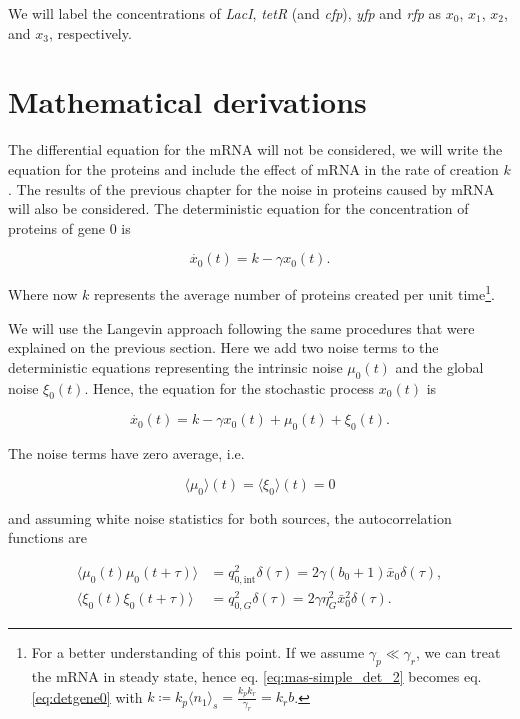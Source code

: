 We will label the concentrations of \textit{LacI}, \textit{tetR} (and \textit{cfp}), \textit{yfp} and \textit{rfp} as $x_0$, $x_1$, $x_2$, and $x_3$, respectively.

\section{Mathematical derivations}

The differential equation for the mRNA will not be considered, we will write the equation for the proteins and include the effect of mRNA in the rate of creation $k$. The results of the previous chapter for the noise in proteins caused by mRNA will also be considered. The deterministic equation for the concentration of proteins of gene $0$ is 

\begin{equation}
\label{eq:detgene0}
\dot{x_0}(t) = k - \gamma x_0(t).
\end{equation}

Where now $k$ represents the average number of proteins created per unit time\footnote{For a better understanding of this point. If we assume $\gamma_p\ll\gamma_r$, we can treat the mRNA in steady state, hence eq. \eqref{eq:mas-simple_det_2} becomes eq. \eqref{eq:detgene0} with $k \coloneqq k_p\langle n_1\rangle_s =  \frac{k_pk_r}{\gamma_r} = k_rb$.}.

We will use the Langevin approach following the same procedures that were explained on the previous section. Here we add two noise terms to the deterministic equations representing the intrinsic noise $\mu_0(t)$ and the global noise $\xi_0(t)$. Hence, the equation for the stochastic process $x_0(t)$ is

\begin{equation}
\label{eq:gene0}
\dot{x_0}(t) = k - \gamma x_0(t) + \mu_0(t) + \xi_0(t).
\end{equation}

The noise terms have zero average, i.e.

\begin{equation*}
\langle\mu_0\rangle(t) = \langle\xi_0\rangle(t) = 0
\end{equation*}

and assuming white noise statistics for both sources, the autocorrelation functions are

\begin{align}
\langle\mu_0(t)\mu_0(t+\tau)\rangle&=q^2_{0,\text{int}}\delta(\tau)=2\gamma(b_0+1)\bar{x}_0\delta(\tau),\label{eq:corin0}\\
\langle\xi_0(t)\xi_0(t+\tau)\rangle&=q^2_{0,G}\delta(\tau)=2\gamma\eta_G^2\bar{x}_0^2\delta(\tau). \label{eq:corex0}
\end{align}

